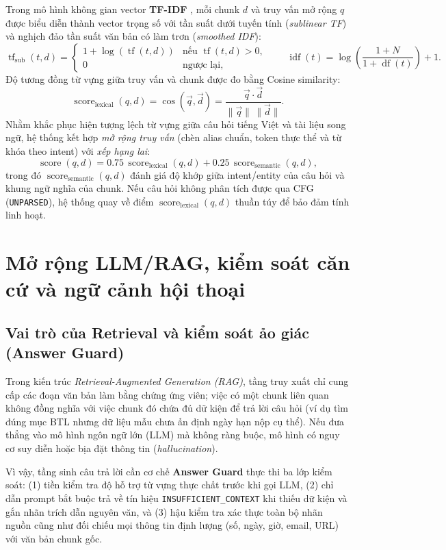Trong mô hình không gian vector \textbf{TF-IDF} \cite{manning-ir, sklearn-text}, mỗi chunk $d$ và truy vấn mở rộng $q$ được biểu diễn thành vector trọng số với tần suất dưới tuyến tính (\emph{sublinear TF}) và nghịch đảo tần suất văn bản có làm trơn (\emph{smoothed IDF}):
\[
\operatorname{tf}_{\text{sub}}(t, d) =
\begin{cases}
  1 + \log(\operatorname{tf}(t, d)) & \text{nếu } \operatorname{tf}(t, d) > 0, \\
  0 & \text{ngược lại,}
\end{cases}
\qquad
\operatorname{idf}(t) = \log\left(\frac{1 + N}{1 + \operatorname{df}(t)}\right) + 1.
\]
Độ tương đồng từ vựng giữa truy vấn và chunk được đo bằng Cosine similarity:
\[
\operatorname{score}_{\text{lexical}}(q, d) = \cos(\vec{q}, \vec{d}) = \frac{\vec{q}\cdot\vec{d}}{\|\vec{q}\|\,\|\vec{d}\|}.
\]
Nhằm khắc phục hiện tượng lệch từ vựng giữa câu hỏi tiếng Việt và tài liệu song ngữ, hệ thống kết hợp \emph{mở rộng truy vấn} (chèn alias chuẩn, token thực thể và từ khóa theo intent) với \emph{xếp hạng lai}:
\[
\operatorname{score}(q, d) = 0.75\,\operatorname{score}_{\text{lexical}}(q, d) + 0.25\,\operatorname{score}_{\text{semantic}}(q, d),
\]
trong đó $\operatorname{score}_{\text{semantic}}(q, d)$ đánh giá độ khớp giữa intent/entity của câu hỏi và khung ngữ nghĩa của chunk. Nếu câu hỏi không phân tích được qua CFG (\texttt{UNPARSED}), hệ thống quay về điểm $\operatorname{score}_{\text{lexical}}(q, d)$ thuần túy để bảo đảm tính linh hoạt.

\section{Mở rộng LLM/RAG, kiểm soát căn cứ và ngữ cảnh hội thoại}

\subsection{Vai trò của Retrieval và kiểm soát ảo giác (Answer Guard)}

Trong kiến trúc \emph{Retrieval-Augmented Generation (RAG)}, tầng truy xuất chỉ cung cấp các đoạn văn bản làm bằng chứng ứng viên; việc có một chunk liên quan không đồng nghĩa với việc chunk đó chứa đủ dữ kiện để trả lời câu hỏi (ví dụ tìm đúng mục BTL nhưng dữ liệu mẫu chưa ấn định ngày hạn nộp cụ thể). Nếu đưa thẳng vào mô hình ngôn ngữ lớn (LLM) mà không ràng buộc, mô hình có nguy cơ suy diễn hoặc bịa đặt thông tin (\emph{hallucination}).

Vì vậy, tầng sinh câu trả lời cần cơ chế \textbf{Answer Guard} thực thi ba lớp kiểm soát: (1) tiền kiểm tra độ hỗ trợ từ vựng thực chất trước khi gọi LLM, (2) chỉ dẫn prompt bắt buộc trả về tín hiệu \texttt{INSUFFICIENT\_CONTEXT} khi thiếu dữ kiện và gắn nhãn trích dẫn nguyên văn, và (3) hậu kiểm tra xác thực toàn bộ nhãn nguồn cũng như đối chiếu mọi thông tin định lượng (số, ngày, giờ, email, URL) với văn bản chunk gốc.

